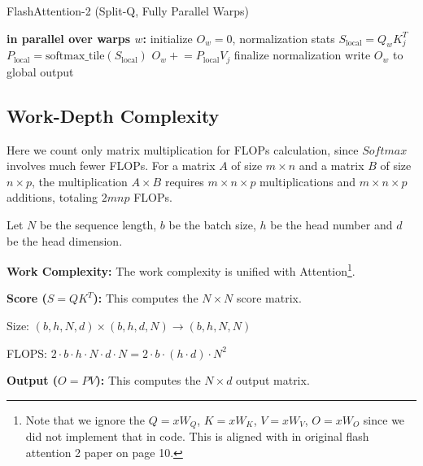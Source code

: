 \documentclass[11pt]{article}
\begin{document}
\begin{algorithm}[htbp]
\caption{FlashAttention-2 (Split-Q, Fully Parallel Warps)}
\begin{algorithmic}[1]
\STATE \textbf{in parallel over warps $w$:} 
\STATE \hspace{0.5cm} initialize $O_w = 0$, normalization stats
    \STATE \hspace{0.5cm} $S_{\text{local}} = Q_w K_j^{T}$
    \STATE \hspace{0.5cm} $P_{\text{local}} = \text{softmax\_tile}(S_{\text{local}})$
    \STATE \hspace{0.5cm} $O_w \mathrel{+}= P_{\text{local}} V_j$ 
\ENDFOR
\STATE \hspace{0.5cm} finalize normalization
\STATE \hspace{0.5cm} write $O_w$ to global output
\end{algorithmic}
\end{algorithm}

\subsection{Work-Depth Complexity}

Here we count only matrix multiplication for FLOPs calculation, since $Softmax$ involves much fewer FLOPs. For a matrix $A$ of size $m \times n$ and a matrix $B$ of size $n \times p$,  the multiplication $A \times B$ requires $m \times n \times p$ multiplications and $m \times n \times p$ additions, totaling $2mnp$ FLOPs.

Let $N$ be the sequence length, $b$ be the batch size, $h$ be the head number and $d$ be the head dimension.

\textbf{Work Complexity: } The work complexity is unified with Attention\footnote{Note that we ignore the $Q=xW_Q$, $K=xW_K$, $V=xW_V$, $O=xW_O$ since we did not implement that in code. This is aligned with in original flash attention 2 paper on page 10.}.


\textbf{Score ($S = QK^T$):} This computes the $N \times N$ score matrix.

Size: $(b, h, N, d) \times (b, h, d, N) \rightarrow (b, h, N, N)$

FLOPS: $2 \cdot b \cdot h \cdot N \cdot d \cdot N = 2 \cdot b \cdot (h \cdot d) \cdot N^2$

\textbf{Output ($O = PV$):} This computes the $N \times d$ output matrix.
\end{document}
